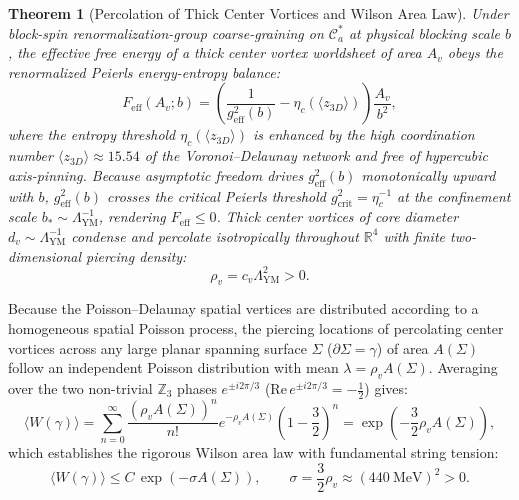\documentclass[11pt, a4paper]{article}
\newtheorem{theorem}{Theorem}[section]
\theoremstyle{definition}
\theoremstyle{remark}
\begin{document}
\begin{theorem}[Percolation of Thick Center Vortices and Wilson Area Law]
\label{thm:vortex_percolation}
Under block-spin renormalization-group coarse-graining on $\mathcal{C}_{a}^{*}$ at physical blocking scale $b$, the effective free energy of a thick center vortex worldsheet of area $A_{v}$ obeys the renormalized Peierls energy-entropy balance:
\begin{equation}
  F_{\mathrm{eff}}(A_{v}; b) = \left(\frac{1}{g_{\mathrm{eff}}^{2}(b)} - \eta_{c}(\langle z_{3D} \rangle)\right) \frac{A_{v}}{b^{2}},
\end{equation}
where the entropy threshold $\eta_{c}(\langle z_{3D} \rangle)$ is enhanced by the high coordination number $\langle z_{3D} \rangle \approx 15.54$ of the Voronoi--Delaunay network and free of hypercubic axis-pinning. Because asymptotic freedom drives $g_{\mathrm{eff}}^{2}(b)$ monotonically upward with $b$, $g_{\mathrm{eff}}^{2}(b)$ crosses the critical Peierls threshold $g_{\mathrm{crit}}^{2} = \eta_{c}^{-1}$ at the confinement scale $b_{*} \sim \Lambda_{\mathrm{YM}}^{-1}$, rendering $F_{\mathrm{eff}} \le 0$. Thick center vortices of core diameter $d_{v} \sim \Lambda_{\mathrm{YM}}^{-1}$ condense and percolate isotropically throughout $\mathbb{R}^{4}$ with finite two-dimensional piercing density:
\begin{equation}
  \rho_{v} = c_{v}\Lambda_{\mathrm{YM}}^{2} > 0.
\end{equation}
\end{theorem}

Because the Poisson--Delaunay spatial vertices are distributed according to a homogeneous spatial Poisson process, the piercing locations of percolating center vortices across any large planar spanning surface $\Sigma$ ($\partial\Sigma = \gamma$) of area $A(\Sigma)$ follow an independent Poisson distribution with mean $\lambda = \rho_{v}A(\Sigma)$. Averaging over the two non-trivial $\mathbb{Z}_{3}$ phases $e^{\pm i2\pi/3}$ ($\mathrm{Re}\,e^{\pm i2\pi/3} = -\frac{1}{2}$) gives:
\begin{equation}
  \langle W(\gamma) \rangle = \sum_{n=0}^{\infty} \frac{(\rho_{v}A(\Sigma))^{n}}{n!} e^{-\rho_{v}A(\Sigma)} \left(1 - \frac{3}{2}\right)^{n} = \exp\!\left(-\frac{3}{2}\rho_{v}A(\Sigma)\right),
\end{equation}
which establishes the rigorous Wilson area law with fundamental string tension:
\begin{equation}
  \langle W(\gamma) \rangle \le C\,\exp\!\left(-\sigma A(\Sigma)\right), \qquad \sigma = \frac{3}{2}\rho_{v} \approx (440~\mathrm{MeV})^{2} > 0.
\end{equation}
\end{document}
